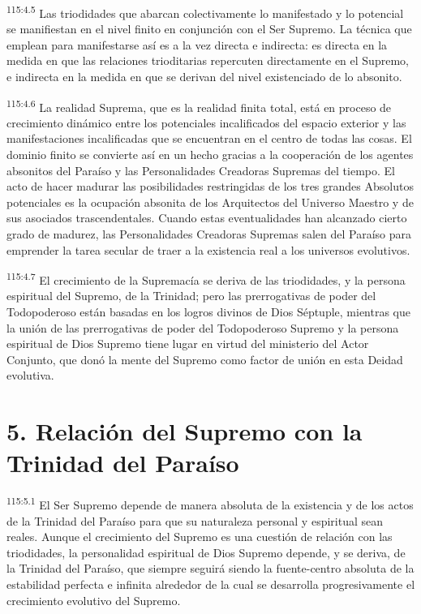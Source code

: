 \par
\textsuperscript{115:4.5} Las triodidades que abarcan colectivamente lo manifestado y lo potencial se manifiestan en el nivel finito en conjunción con el Ser Supremo. La técnica que emplean para manifestarse así es a la vez directa e indirecta: es directa en la medida en que las relaciones trioditarias repercuten directamente en el Supremo, e indirecta en la medida en que se derivan del nivel existenciado de lo absonito.

\par
\textsuperscript{115:4.6} La realidad Suprema, que es la realidad finita total, está en proceso de crecimiento dinámico entre los potenciales incalificados del espacio exterior y las manifestaciones incalificadas que se encuentran en el centro de todas las cosas. El dominio finito se convierte así en un hecho gracias a la cooperación de los agentes absonitos del Paraíso y las Personalidades Creadoras Supremas del tiempo. El acto de hacer madurar las posibilidades restringidas de los tres grandes Absolutos potenciales es la ocupación absonita de los Arquitectos del Universo Maestro y de sus asociados trascendentales. Cuando estas eventualidades han alcanzado cierto grado de madurez, las Personalidades Creadoras Supremas salen del Paraíso para emprender la tarea secular de traer a la existencia real a los universos evolutivos.

\par
\textsuperscript{115:4.7} El crecimiento de la Supremacía se deriva de las triodidades, y la persona espiritual del Supremo, de la Trinidad; pero las prerrogativas de poder del Todopoderoso están basadas en los logros divinos de Dios Séptuple, mientras que la unión de las prerrogativas de poder del Todopoderoso Supremo y la persona espiritual de Dios Supremo tiene lugar en virtud del ministerio del Actor Conjunto, que donó la mente del Supremo como factor de unión en esta Deidad evolutiva.

\section*{5. Relación del Supremo con la Trinidad del Paraíso}
\par
\textsuperscript{115:5.1} El Ser Supremo depende de manera absoluta de la existencia y de los actos de la Trinidad del Paraíso para que su naturaleza personal y espiritual sean reales. Aunque el crecimiento del Supremo es una cuestión de relación con las triodidades, la personalidad espiritual de Dios Supremo depende, y se deriva, de la Trinidad del Paraíso, que siempre seguirá siendo la fuente-centro absoluta de la estabilidad perfecta e infinita alrededor de la cual se desarrolla progresivamente el crecimiento evolutivo del Supremo.


